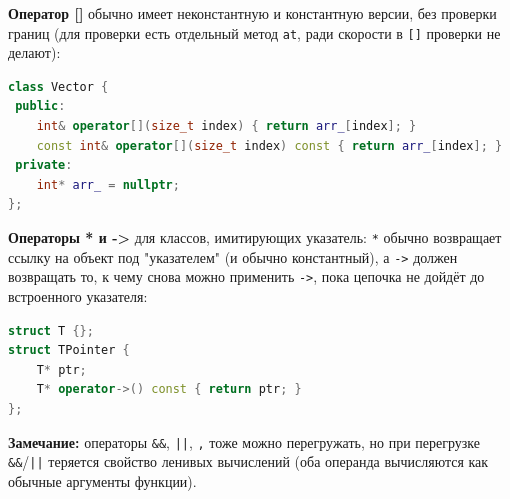 \textbf{Оператор []} обычно имеет неконстантную и константную версии, без проверки границ (для проверки есть отдельный метод \texttt{at}, ради скорости в \texttt{[]} проверки не делают):
\begin{lstlisting}[language=C++]
class Vector {
 public:
    int& operator[](size_t index) { return arr_[index]; }
    const int& operator[](size_t index) const { return arr_[index]; }
 private:
    int* arr_ = nullptr;
};
\end{lstlisting}
\textbf{Операторы * и ->} для классов, имитирующих указатель: \texttt{*} обычно возвращает ссылку на объект под "указателем" (и обычно константный), а \texttt{->} должен возвращать то, к чему снова можно применить \texttt{->}, пока цепочка не дойдёт до встроенного указателя:
\begin{lstlisting}[language=C++]
struct T {};
struct TPointer {
    T* ptr;
    T* operator->() const { return ptr; }
};
\end{lstlisting}
\textbf{Замечание:} операторы \texttt{\&\&}, \texttt{||}, \texttt{,} тоже можно перегружать, но при перегрузке \texttt{\&\&}/\texttt{||} теряется свойство ленивых вычислений (оба операнда вычисляются как обычные аргументы функции).
